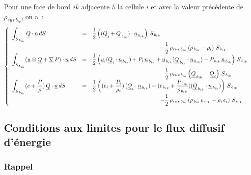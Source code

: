 Pour une face de bord $ik$ adjacente à la cellule $i$ et
avec la valeur précédente de $\rho_{rus\,{b}_{ik}}$, on a~:
\begin{equation}
\left\{\begin{array}{lll}
\displaystyle\int_{S_{\,{b}_{ik}}}\vect{Q}\cdot\vect{n}\,dS
&=&
\displaystyle\frac{1}{2}\left(
(\vect{Q}_i+\vect{Q}_{\,{b}_{ik}})\cdot\vect{n}_{\,{b}_{ik}}\right)\,S_{\,{b}_{ik}}\\
&&\displaystyle \qquad\qquad\qquad\qquad\qquad\qquad
-\frac{1}{2}\,\rho_{rus\,{b}_{ik}}
\left(\rho_{\,{b}_{ik}}-\rho_i \right)\,S_{\,{b}_{ik}}\\
%
\displaystyle\int_{S_{\,{b}_{ik}}}(\vect{u}\otimes\vect{Q}+\grad\,P)\cdot\vect{n}\,dS
&=&
\displaystyle\frac{1}{2}\left(
 \vect{u}_i(\vect{Q}_i\cdot\vect{n}_{\,{b}_{ik}})
+P_i\,\vect{n}_{\,{b}_{ik}}
+\vect{u}_{\,{b}_{ik}}(\vect{Q}_{\,{b}_{ik}}\cdot\vect{n}_{\,{b}_{ik}})
+P_{\,{b}_{ik}}\,\vect{n}_{\,{b}_{ik}}\right)\,S_{\,{b}_{ik}}\\
&&\displaystyle \qquad\qquad\qquad\qquad\qquad\qquad
-\frac{1}{2}\,\rho_{rus\,{b}_{ik}}
\left(\vect{Q}_{\,{b}_{ik}}-\vect{Q}_i \right)\,S_{\,{b}_{ik}}\\
%
\displaystyle\int_{S_{\,{b}_{ik}}}(e+\frac{P}{\rho})\,\vect{Q}\cdot\vect{n}\,dS
&=&
\displaystyle\frac{1}{2}\left(
(e_i+\frac{P_i}{\rho_i})\,(\vect{Q}_i\cdot\vect{n}_{\,{b}_{ik}})
+(e_{\,{b}_{ik}}+\frac{P_{\,{b}_{ik}}}{\rho_{\,{b}_{ik}}})(\vect{Q}_{\,{b}_{ik}}\cdot\vect{n}_{\,{b}_{ik}})
\right)\,S_{\,{b}_{ik}}\\
&&\displaystyle \qquad\qquad\qquad\qquad\qquad\qquad
-\frac{1}{2}\,\rho_{rus\,{b}_{ik}}
\left(\rho_{\,{b}_{ik}}\,e_{\,{b}_{ik}}-\rho_i\,e_i \right)\,S_{\,{b}_{ik}}\\
\end{array}\right.
\end{equation}



\subsection*{Conditions aux limites pour le flux diffusif d'énergie}
\label{Cfbl_Cfxtcl_section_cl_flux_diffusif_energie_cfener}

\subsubsection*{Rappel}

